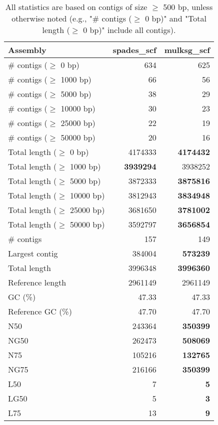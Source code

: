 \documentclass[12pt,a4paper]{article}
\begin{document}
\begin{table}[ht]
\begin{center}
\caption{All statistics are based on contigs of size $\geq$ 500 bp, unless otherwise noted (e.g., "\# contigs ($\geq$ 0 bp)" and "Total length ($\geq$ 0 bp)" include all contigs).}
\begin{tabular}{|l*{2}{|r}|}
\hline
Assembly & spades\_scf & mulksg\_scf \\ \hline
\# contigs ($\geq$ 0 bp) & 634 & 625 \\ \hline
\# contigs ($\geq$ 1000 bp) & 66 & 56 \\ \hline
\# contigs ($\geq$ 5000 bp) & 38 & 29 \\ \hline
\# contigs ($\geq$ 10000 bp) & 30 & 23 \\ \hline
\# contigs ($\geq$ 25000 bp) & 22 & 19 \\ \hline
\# contigs ($\geq$ 50000 bp) & 20 & 16 \\ \hline
Total length ($\geq$ 0 bp) & 4174333 & {\bf 4174432} \\ \hline
Total length ($\geq$ 1000 bp) & {\bf 3939294} & 3938252 \\ \hline
Total length ($\geq$ 5000 bp) & 3872333 & {\bf 3875816} \\ \hline
Total length ($\geq$ 10000 bp) & 3812943 & {\bf 3834948} \\ \hline
Total length ($\geq$ 25000 bp) & 3681650 & {\bf 3781002} \\ \hline
Total length ($\geq$ 50000 bp) & 3592797 & {\bf 3656854} \\ \hline
\# contigs & 157 & 149 \\ \hline
Largest contig & 384004 & {\bf 573239} \\ \hline
Total length & 3996348 & {\bf 3996360} \\ \hline
Reference length & 2961149 & 2961149 \\ \hline
GC (\%) & 47.33 & 47.33 \\ \hline
Reference GC (\%) & 47.70 & 47.70 \\ \hline
N50 & 243364 & {\bf 350399} \\ \hline
NG50 & 262473 & {\bf 508069} \\ \hline
N75 & 105216 & {\bf 132765} \\ \hline
NG75 & 216166 & {\bf 350399} \\ \hline
L50 & 7 & {\bf 5} \\ \hline
LG50 & 5 & {\bf 3} \\ \hline
L75 & 13 & {\bf 9} \\ \hline

\end{tabular}
\end{center}
\end{table}
\end{document}
